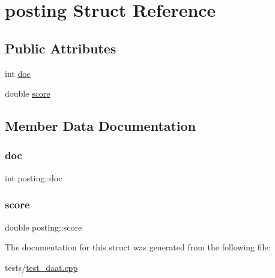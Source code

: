 \hypertarget{structposting}{}\section{posting Struct Reference}
\label{structposting}
\subsection*{Public Attributes}
\begin{DoxyCompactItemize}
\item 
int \hyperlink{structposting_ae2e7ce38f34b758309d2152de622fef6}{doc}
\item 
double \hyperlink{structposting_a536bc5a04f4f5c159a4e23466512c201}{score}
\end{DoxyCompactItemize}


\subsection{Member Data Documentation}
\mbox{\label{structposting_ae2e7ce38f34b758309d2152de622fef6}} 
\subsubsection{\texorpdfstring{doc}{doc}}
{\footnotesize\ttfamily int posting\+::doc}

\mbox{\label{structposting_a536bc5a04f4f5c159a4e23466512c201}} 
\subsubsection{\texorpdfstring{score}{score}}
{\footnotesize\ttfamily double posting\+::score}



The documentation for this struct was generated from the following file\+:\begin{DoxyCompactItemize}
\item 
tests/\hyperlink{test__daat_8cpp}{test\+\_\+daat.\+cpp}\end{DoxyCompactItemize}
